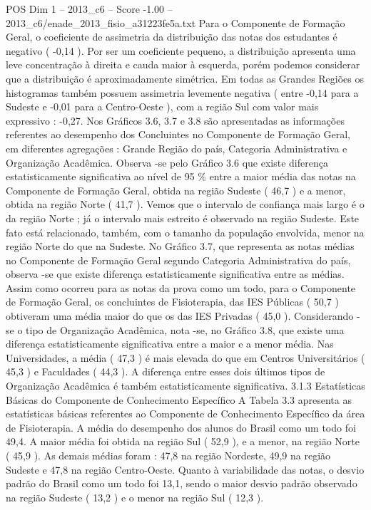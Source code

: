 \begin{textsample}{POS Dim 1 – 2013\_c6 – Score -1.00 – 2013\_c6/enade\_2013\_fisio\_a31223fe5a.txt}
Para o Componente de Formação Geral, o coeficiente de assimetria da distribuição das notas dos estudantes é negativo ( -0,14 ).
Por ser um coeficiente pequeno, a distribuição apresenta uma leve concentração à direita e cauda maior à esquerda, porém podemos considerar que a distribuição é aproximadamente simétrica.
Em todas as Grandes Regiões os histogramas também possuem assimetria levemente negativa ( entre -0,14 para a Sudeste e -0,01 para a Centro-Oeste ), com a região Sul com valor mais expressivo : -0,27.
Nos Gráficos 3.6, 3.7 e 3.8 são apresentadas as informações referentes ao desempenho dos Concluintes no Componente de Formação Geral, em diferentes agregações : Grande Região do país, Categoria Administrativa e Organização Acadêmica.
Observa -se pelo Gráfico 3.6 que existe diferença estatisticamente significativa ao nível de 95 \% entre a maior média das notas na Componente de Formação Geral, obtida na região Sudeste ( 46,7 ) e a menor, obtida na região Norte ( 41,7 ).
Vemos que o intervalo de confiança mais largo é o da região Norte ; já o intervalo mais estreito é observado na região Sudeste.
Este fato está relacionado, também, com o tamanho da população envolvida, menor na região Norte do que na Sudeste.
No Gráfico 3.7, que representa as notas médias no Componente de Formação Geral segundo Categoria Administrativa do país, observa -se que existe diferença estatisticamente significativa entre as médias.
Assim como ocorreu para as notas da prova como um todo, para o Componente de Formação Geral, os concluintes de Fisioterapia, das IES Públicas ( 50,7 ) obtiveram uma média maior do que os das IES Privadas ( 45,0 ).
Considerando -se o tipo de Organização Acadêmica, nota -se, no Gráfico 3.8, que existe uma diferença estatisticamente significativa entre a maior e a menor média.
Nas Universidades, a média ( 47,3 ) é mais elevada do que em Centros Universitários ( 45,3 ) e Faculdades ( 44,3 ).
A diferença entre esses dois últimos tipos de Organização Acadêmica é também estatisticamente significativa. 3.1.3 Estatísticas Básicas do Componente de Conhecimento Específico A Tabela 3.3 apresenta as estatísticas básicas referentes ao Componente de Conhecimento Específico da área de Fisioterapia.
A média do desempenho dos alunos do Brasil como um todo foi 49,4.
A maior média foi obtida na região Sul ( 52,9 ), e a menor, na região Norte ( 45,9 ).
As demais médias foram : 47,8 na região Nordeste, 49,9 na região Sudeste e 47,8 na região Centro-Oeste.
Quanto à variabilidade das notas, o desvio padrão do Brasil como um todo foi 13,1, sendo o maior desvio padrão observado na região Sudeste ( 13,2 ) e o menor na região Sul ( 12,3 ).

\end{textsample}
